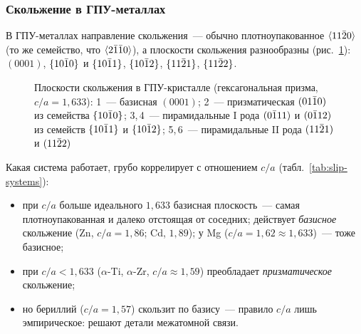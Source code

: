 \subsubsection{Скольжение в ГПУ-металлах}

В ГПУ-металлах направление скольжения~— обычно плотноупакованное
$\langle 11\bar{2}0\rangle$ (то же семейство, что $\langle 2\bar{1}\bar{1}0\rangle$), а плоскости
скольжения разнообразны (рис.~\ref{fig:hcp-slip}): 
$(0001)$,  $\{10\bar{1}0\}$ и 
$\{10\bar{1}1\}$, $\{10\bar{1}2\}$, $\{11\bar{2}1\}$,
$\{11\bar{2}2\}$.

\begin{figure}[ht]
\centering
\begin{tikzpicture}[cubeproj, scale=0.95]
  
\end{tikzpicture}
\caption{Плоскости скольжения в ГПУ-кристалле (гексагональная призма,
$c/a=1{,}633$): 1~— базисная $(0001)$; 2~— призматическая $(01\bar{1}0)$
из семейства $\{10\bar{1}0\}$; 3,\,4~— пирамидальные I рода $(0\bar{1}11)$ и
$(0\bar{1}12)$ из семейств $\{10\bar{1}1\}$ и $\{10\bar{1}2\}$; 5,\,6~—
пирамидальные II рода $(11\bar{2}1)$ и $(11\bar{2}2)$}
\label{fig:hcp-slip}
\end{figure}

Какая система работает, грубо коррелирует с отношением $c/a$
(табл.~\ref{tab:slip-systems}):
\begin{itemize}
\item при $c/a$ больше идеального $1{,}633$ базисная плоскость~— самая
плотноупакованная и далеко отстоящая от соседних; действует
\emph{базисное} скольжение (Zn, $c/a=1{,}86$; Cd, $1{,}89$); у Mg
($c/a=1{,}62\approx1{,}633$)~— тоже базисное;
\item при $c/a<1{,}633$ ($\alpha$-Ti, $\alpha$-Zr, $c/a\approx1{,}59$)
преобладает \emph{призматическое} скольжение;
\item но бериллий ($c/a=1{,}57$) скользит по базису~— правило $c/a$
лишь эмпирическое: решают детали межатомной связи.
\end{itemize}

